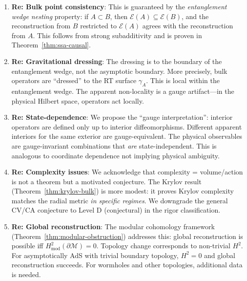 \documentclass[12pt,a4paper]{article}
\begin{document}
\vspace{1em}

\begin{tcolorbox}[colback=blue!5!white, colframe=blue!75!black, title=\textbf{BLUE TEAM Round 7: Addressing Novel Attacks}]

\begin{enumerate}[label=\textbf{B7.\arabic*.}]
    \item \textbf{Re: Bulk point consistency}: This is guaranteed by the \emph{entanglement wedge nesting} property: if $A \subset B$, then $\mathcal{E}(A) \subseteq \mathcal{E}(B)$, and the reconstruction from $B$ restricted to $\mathcal{E}(A)$ agrees with the reconstruction from $A$. This follows from strong subadditivity and is proven in Theorem~\ref{thm:ssa-causal}.
    
    \item \textbf{Re: Gravitational dressing}: The dressing is to the boundary of the entanglement wedge, not the asymptotic boundary. More precisely, bulk operators are ``dressed'' to the RT surface $\gamma_A$. This is local within the entanglement wedge. The apparent non-locality is a gauge artifact---in the physical Hilbert space, operators act locally.
    
    \item \textbf{Re: State-dependence}: We propose the ``gauge interpretation'': interior operators are defined only up to interior diffeomorphisms. Different apparent interiors for the same exterior are gauge-equivalent. The physical observables are gauge-invariant combinations that \emph{are} state-independent. This is analogous to coordinate dependence not implying physical ambiguity.
    
    \item \textbf{Re: Complexity issues}: We acknowledge that complexity = volume/action is not a theorem but a motivated conjecture. The Krylov result (Theorem~\ref{thm:krylov-bulk}) is more modest: it proves Krylov complexity matches the radial metric \emph{in specific regimes}. We downgrade the general CV/CA conjecture to Level D (conjectural) in the rigor classification.
    
    \item \textbf{Re: Global reconstruction}: The modular cohomology framework (Theorem~\ref{thm:modular-obstruction}) addresses this: global reconstruction is possible iff $H^2_{\text{mod}}(\partial\mathcal{M}) = 0$. Topology change corresponds to non-trivial $H^2$. For asymptotically AdS with trivial boundary topology, $H^2 = 0$ and global reconstruction succeeds. For wormholes and other topologies, additional data is needed.
\end{enumerate}

\end{tcolorbox}
\end{document}
